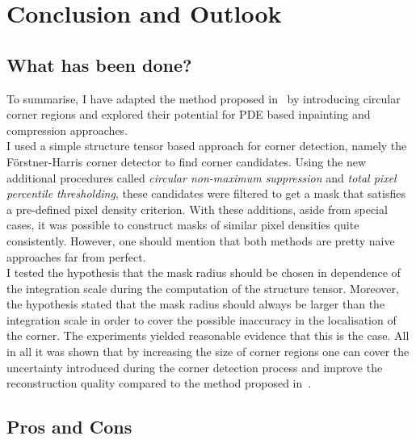 \chapter{Conclusion and Outlook}\label{ch:Conclusion}

\section{What has been done?}

To summarise, I have adapted the method proposed in~\cite{zimmer07} by introducing circular corner
regions and explored their potential for PDE based inpainting and compression approaches.\\
I used a simple structure tensor based approach for corner detection, namely the Förstner-Harris
corner detector to find corner candidates. Using the new additional procedures called
\textit{circular non-maximum suppression} and \textit{total pixel percentile thresholding}, these
candidates were filtered to get a mask that satisfies a pre-defined pixel density criterion. With
these additions, aside from special cases, it was possible to construct masks of similar pixel
densities quite consistently. However, one should mention that both methods are pretty naive
approaches far from perfect.\\
I tested the hypothesis that the mask radius should be chosen in dependence of the integration
scale during the computation of the structure tensor. Moreover, the hypothesis stated that the mask
radius should always be larger than the integration scale in order to cover the possible inaccuracy
in the localisation of the corner. The experiments yielded reasonable evidence that this is the
case. 
All in all it was shown that by increasing the size of corner regions one can cover the uncertainty
introduced during the corner detection process and improve the reconstruction quality compared to
the method proposed in~\cite{zimmer07}.

\section{Pros and Cons}

